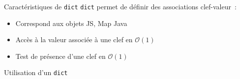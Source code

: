 \begin{frame}{Caractéristiques de \texttt{dict}}
  \texttt{dict} permet de définir des associations clef-valeur~:
  \begin{itemize}
    \item Correspond aux objets JS, Map Java
    \item Accès à la valeur associée à une clef en $\mathcal{O}(1)$
    \item Test de présence d'une clef en $\mathcal{O}(1)$
  \end{itemize}
\end{frame}

\begin{frame}{Utilisation d'un \texttt{dict}}
\end{frame}
